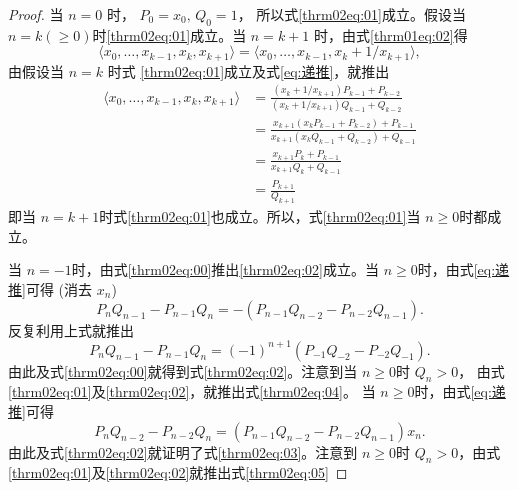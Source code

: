 \begin{proof}
	当 \( n = 0 \) 时， \( P_0 = x_0,\, Q_0 = 1 \)， 所以式\eqref{thrm02eq:01}成立。假设当 \( n = k(\ge 0) \)时\eqref{thrm02eq:01}成立。当 \( n = k + 1 \) 时，由式\eqref{thrm01eq:02}得
	\begin{equation*}
		\langle x_0, \dots, x_{k-1}, x_k, x_{k+1} \rangle = \langle x_0, \dots, x_{k-1}, x_k + 1/x_{k+1} \rangle,
	\end{equation*}
	由假设当 \( n = k \) 时式 \eqref{thrm02eq:01}成立及式\eqref{eq:递推}，就推出
	\begin{align*}
		\langle x_0, \dots, x_{k-1}, x_k, x_{k+1} \rangle
		 & = \frac{(x_k + 1/x_{k+1})P_{k-1}+P_{k-2}}{(x_k + 1/x_{k+1})Q_{k-1} + Q_{k-2}}           \\
		 & = \frac{x_{k+1}(x_kP_{k-1} + P_{k-2})+P_{k-1}}{x_{k+1}(x_kQ_{k-1} + Q_{k-2}) + Q_{k-1}} \\
		 & = \frac{x_{k+1}P_k + P_{k-1}}{x_{k+1}Q_k + Q_{k-1}}                                     \\
		 & = \frac{P_{k+1}}{Q_{k+1}}
	\end{align*}
	即当 \( n = k + 1 \)时式\eqref{thrm02eq:01}也成立。所以，式\eqref{thrm02eq:01}当 \( n \ge 0 \)时都成立。

	当 \( n = -1 \)时，由式\eqref{thrm02eq:00}推出\eqref{thrm02eq:02}成立。当 \( n \ge 0 \)时，由式\eqref{eq:递推}可得 (消去 \( x_n \))
	\begin{equation}
		P_nQ_{n-1} - P_{n-1}Q_n = -(P_{n-1}Q_{n-2} - P_{n-2}Q_{n-1}).
	\end{equation}
	反复利用上式就推出
	\begin{equation*}
		P_nQ_{n-1} - P_{n-1}Q_n = (-1)^{n+1}(P_{-1}Q_{-2} - P_{-2}Q_{-1}).
	\end{equation*}
	由此及式\eqref{thrm02eq:00}就得到式\eqref{thrm02eq:02}。注意到当 \( n \ge 0 \)时 \( Q_n > 0 \)，
	由式\eqref{thrm02eq:01}及\eqref{thrm02eq:02}，就推出式\eqref{thrm02eq:04}。
	当 \( n \ge 0 \)时，由式\eqref{eq:递推}可得
	\begin{equation}
		P_nQ_{n-2} - P_{n-2}Q_n = (P_{n-1}Q_{n-2} - P_{n-2}Q_{n-1})x_n.
	\end{equation}
	由此及式\eqref{thrm02eq:02}就证明了式\eqref{thrm02eq:03}。注意到 \( n \ge 0 \)时 \( Q_n > 0
	\)，由式\eqref{thrm02eq:01}及\eqref{thrm02eq:02}就推出式\eqref{thrm02eq:05}
\end{proof}

